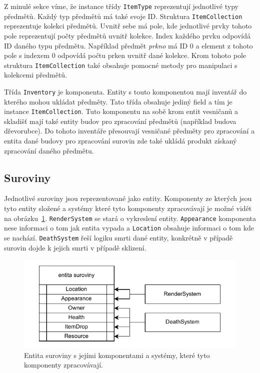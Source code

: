 Z minulé sekce víme, že instance třídy \texttt{ItemType} reprezentují jednotlivé typy předmětů. Každý typ předmětů má také svoje ID. Struktura \texttt{ItemCollection} reprezentuje kolekci předmětů. Uvnitř sebe má pole, kde jednotlivé prvky tohoto pole reprezentují počty předmětů uvnitř kolekce. Index každého prvku odpovídá ID daného typu předmětu. Například předmět \textit{prkno} má ID 0 a element z tohoto pole s indexem 0 odpovídá počtu prken uvnitř dané kolekce. Krom tohoto pole struktura \texttt{ItemCollection} také obsahuje pomocné metody pro manipulaci s kolekcemi předmětů.

Třída \texttt{Inventory} je komponenta. Entity s touto komponentou mají inventář do kterého mohou ukládat předměty. Tato třída obsahuje jediný field a tím je instance \texttt{ItemCollection}. Tuto komponentu na sobě krom entit vesničanů a skladišť mají také entity budov pro zpracování předmětů (například budova dřevorubce). Do tohoto inventáře přesouvají vesničané předměty pro zpracování a entita dané budovy pro zpracování surovin zde také ukládá produkt získaný zpracování daného předmětu.

\subsection{Suroviny}
Jednotlivé suroviny jsou reprezentované jako entity. Komponenty ze kterých jsou tyto entity složené a systémy které tyto komponenty zpracovávají je možné vidět na obrázku~\ref{fig:resource}. \texttt{RenderSystem} se stará o vykreslení entity. \texttt{Appearance} komponenta nese informaci o tom jak entita vypada a \texttt{Location} obsahuje informaci o tom kde se nachází. \texttt{DeathSystem} řeší logiku smrti dané entity, konkrétně v případě surovin dojde k jejich smrti v případě sklizení.

\begin{figure}[!htb]
  \centering
  \includegraphics[width=0.8\linewidth]{img/resource.pdf}
  \caption{Entita suroviny s jejími komponentami a systémy, které tyto komponenty zpracovávají.}
  \label{fig:resource}
\end{figure}

